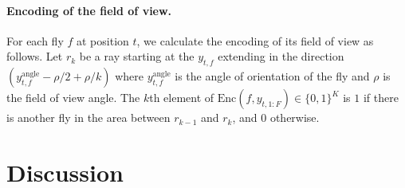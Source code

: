\documentclass{article}
\begin{document}
\paragraph{Encoding of the field of view.}
For each fly $f$ at position $t$, we calculate the encoding of its field of view as follows.
Let $r_k$ be a ray starting at the $y_{t, f}$ extending in the direction $(y_{t, f}^{\text{angle}} -\rho / 2 + \rho / k)$ where $y_{t, f}^{\text{angle}}$ is the angle of orientation of the fly and $\rho$ is the field of view angle.
The $k$th element of $\mathrm{Enc}(f, y_{t, 1:F}) \in \{0, 1\}^K$ is $1$ if there is another fly in the area between $r_{k - 1}$ and $r_k$, and $0$ otherwise.

\section{Discussion}




\end{document}
